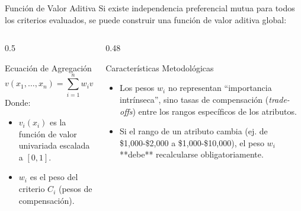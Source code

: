 \documentclass[aspectratio=169, 10pt]{beamer}
\begin{document}
\begin{frame}{Función de Valor Aditiva}
    Si existe independencia preferencial mutua para todos los criterios evaluados, se puede construir una función de valor aditiva global:
    \begin{columns}
        \begin{column}{0.5\textwidth}
            \begin{block}{Ecuación de Agregación}
                \begin{equation*}
                    v(x_1, \dots, x_n) = \sum_{i=1}^n w_i v_i(x_i)
                \end{equation*}
                Donde:
                \begin{itemize}
                    \item $v_i(x_i)$ es la función de valor univariada escalada a $[0, 1]$.
                    \item $w_i$ es el peso del criterio $C_i$ (pesos de compensación).
                \end{itemize}
            \end{block}
        \end{column}
        
        \begin{column}{0.48\textwidth}
            \begin{exampleblock}{Características Metodológicas}
                \begin{itemize}
                    \item Los pesos $w_i$ no representan ``importancia intrínseca'', sino tasas de compensación (\emph{trade-offs}) entre los rangos específicos de los atributos.
                    \item Si el rango de un atributo cambia (ej. de \$1,000-\$2,000 a \$1,000-\$10,000), el peso $w_i$ **debe** recalcularse obligatoriamente.
                \end{itemize}
            \end{exampleblock}
        \end{column}
    \end{columns}
\end{frame}
\end{document}
